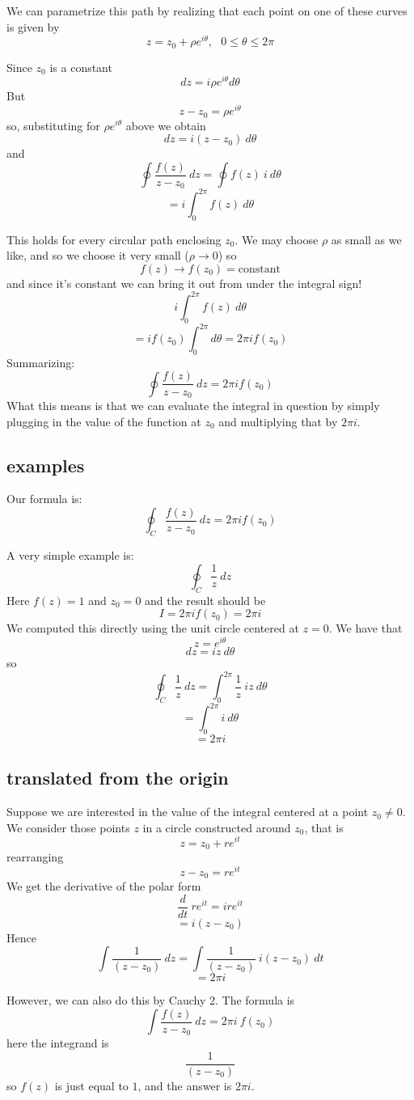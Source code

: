 \documentclass[11pt, oneside]{article}
\begin{document}
We can parametrize this path by realizing that each point on one of these curves is given by
\[ z = z_0 + \rho e^{i\theta}, \ \ \ 0 \le \theta \le 2 \pi \]

Since $z_0$ is a constant
\[ dz = i \rho e^{i \theta} d \theta \]
But
\[ z - z_0 = \rho e^{i\theta} \]
so, substituting for $\rho e^{i\theta}$ above we obtain
\[ dz = i(z - z_0) \ d \theta \]
and
\[ \oint \frac{f(z)}{z - z_0} \ dz = \oint f(z) \ i \ d \theta \]
\[ = i \int_0^{2\pi}  f(z) \ d \theta \]

This holds for every circular path enclosing $z_0$.  We may choose $\rho$ as small as we like, and so we choose it very small ($\rho \rightarrow 0$) so
\[ f(z) \rightarrow f(z_0) = \text{constant} \]
and since it's constant we can bring it out from under the integral sign!
\[ i \int_0^{2\pi}  f(z) \ d \theta \]
\[ = i f(z_0) \int_0^{2\pi} d \theta = 2 \pi i f(z_0) \]
Summarizing:
\[ \oint \frac{f(z)}{z - z_0} \ dz = 2 \pi i f(z_0) \]
What this means is that we can evaluate the integral in question by simply plugging in the value of the function at $z_0$ and multiplying that by $2 \pi i$.

\subsection*{examples}
Our formula is:
\[ \oint_{C} \frac{f(z)}{z-z_0} \ dz = 2 \pi i f(z_0) \]

A very simple example is:
\[ \oint_{C} \frac{1}{z} \ dz \]
Here $f(z) = 1$ and $z_0 = 0$ and the result should be
\[ I = 2 \pi i f(z_0) = 2 \pi i  \]
We computed this directly using the unit circle centered at $z = 0$.  We have that
\[ z = e^{i\theta} \]
\[ dz = i z \ d \theta \]
so
\[ \oint_{C} \frac{1}{z} \ dz = \int_0^{2 \pi}  \frac{1}{z} \ i z \ d \theta \]
\[ = \int_0^{2 \pi} i \ d \theta \]
\[ = 2 \pi i \]

\subsection*{translated from the origin}
Suppose we are interested in the value of the integral centered at a point $z_0 \ne 0$.  We consider those points $z$ in a circle constructed around $z_0$, that is
\[ z = z_0 + re^{it} \]
rearranging
\[ z - z_0 = re^{it} \]
We get the derivative of the polar form
\[ \frac{d}{dt} \ re^{it} = i re^{it}  \]
\[ = i(z-z_0) \]
Hence
\[ \int \frac{1}{(z-z_0)} \ dz  = \int \frac{1}{(z-z_0)} \ i(z - z_0) \ dt \]
\[ = 2 \pi i \]

However, we can also do this by Cauchy 2. The formula is
\[ \int \frac{f(z)}{z - z_0} \ dz = 2 \pi i \ f(z_0) \]
here the integrand is
\[ \frac{1}{(z-z_0)} \]
so $f(z)$ is just equal to $1$, and the answer is $2 \pi i$.
\end{document}
